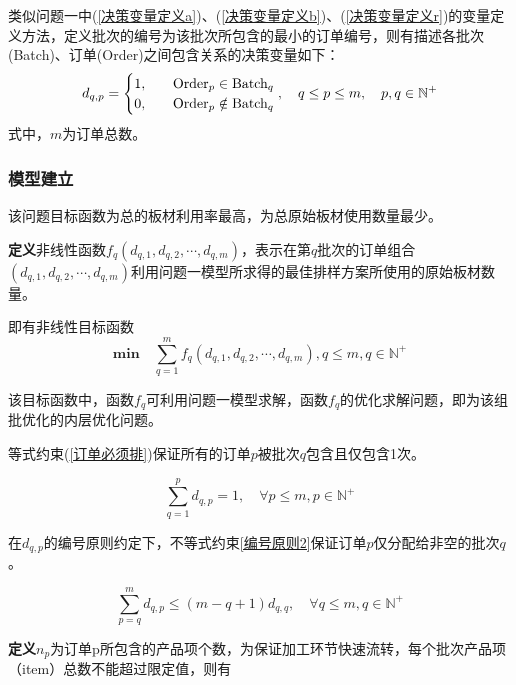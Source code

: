 \documentclass[bwprint]{gmcmthesis}
\begin{document}
类似问题一中(\ref{决策变量定义a})、(\ref{决策变量定义b})、(\ref{决策变量定义r})的变量定义方法，定义批次的编号为该批次所包含的最小的订单编号，则有描述各批次(Batch)、订单(Order)之间包含关系的决策变量如下：
\begin{equation}   %
    d_{q,p}=
    \begin{cases}
        1, \quad  & \text{Order}_p \in  \text{Batch}_q \\
        0,\quad  & \text{Order}_p \notin  \text{Batch}_q \\
    \end{cases},\quad q\le p \le m,\quad p,q \in  \mathbb{N}^+\\
\end{equation}
\noindent 式中，$m$为订单总数。


\subsubsection{模型建立}
该问题目标函数为总的板材利用率最高，为总原始板材使用数量最少。

\textbf{定义}非线性函数$f_q(d_{q,1},d_{q,2},\cdots,d_{q,m})$，表示在第$q$批次的订单组合$(d_{q,1},d_{q,2},\cdots,d_{q,m})$利用问题一模型所求得的最佳排样方案所使用的原始板材数量。

即有非线性目标函数
\begin{equation}   
    \mathbf{min}\quad\sum_{q=1}^{m} f_q(d_{q,1},d_{q,2},\cdots,d_{q,m}),q\le m ,q\in  \mathbb{N}^+\label{目标函数2}
\end{equation}

该目标函数中，函数$f_q$可利用问题一模型求解，函数$f_q$的优化求解问题，即为该组批优化的内层优化问题。

等式约束(\ref{订单必须排})保证所有的订单$p$被批次$q$包含且仅包含1次。

\begin{equation}   
    \sum_{q=1}^{p} d_{q,p}=1,\quad \forall p\le m,p \in \mathbb{N}^+ \label{订单必须排} 
\end{equation}


在$d_{q,p}$的编号原则约定下，不等式约束\ref{编号原则2}保证订单$p$仅分配给非空的批次$q$。

\begin{equation}   
\sum_{p=q}^{m} d_{q,p} \le (m-q+1)d_{q,q},\quad \forall q\le m,q\in \mathbb{N}^+\label{编号原则2}
\end{equation}

\textbf{定义}$n_p$为订单p所包含的产品项个数，为保证加工环节快速流转，每个批次产品项（item）总数不能超过限定值，则有
\end{document}
